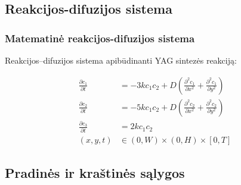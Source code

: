 \documentclass{beamer}
\begin{document}
\subsection{Reakcijos-difuzijos sistema}

\begin{frame}
\frametitle{Matematinė reakcijos-difuzijos sistema}

Reakcijos--difuzijos sistema apibūdinanti YAG sintezės reakciją:

\begin{align*}
    \frac{\partial c_1}{\partial t} & =-3kc_1c_2+D\left(\frac{\partial^2c_1}{\partial x^2}+\frac{\partial^2c_1}{\partial y^2}\right) \\
    \frac{\partial c_2}{\partial t} & =-5kc_1c_2+D\left(\frac{\partial^2c_2}{\partial x^2}+\frac{\partial^2c_2}{\partial y^2}\right)\\
    \frac{\partial c_3}{\partial t} & =2kc_1c_2\\
    (x, y, t)&\in(0, W)\times(0, H)\times[0, T]
\end{align*}

\end{frame}

\subsection{Pradinės ir kraštinės sąlygos}
\end{document}
